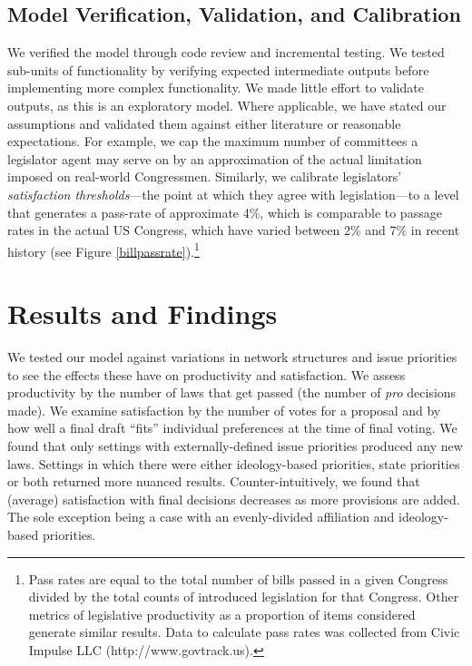 \documentclass[pdftex,12pt]{llncs}
\begin{document}
\subsection{Model Verification, Validation, and Calibration}
We verified the model through code review and incremental testing.
We tested sub-units of functionality by verifying expected intermediate outputs before implementing more complex functionality.
We made little effort to validate outputs, as this is an exploratory model.
Where applicable, we have stated our assumptions and validated them against either literature or reasonable expectations.
For example, we cap the maximum number of committees a legislator agent may serve on by an approximation of the actual limitation imposed on real-world Congressmen.
Similarly, we calibrate legislators' \textit{satisfaction thresholds}---the point at which they agree with legislation---to a level that generates a pass-rate of approximate 4\%, which is comparable to passage rates in the actual US Congress, which have varied between 2\% and 7\% in recent history (see Figure \ref{billpassrate}).\footnote{Pass rates are equal to the total number of bills passed in a given Congress divided by the total counts of introduced legislation for that Congress. Other metrics of legislative productivity as a proportion of items considered generate similar results. Data to calculate pass rates was collected from Civic Impulse LLC (http://www.govtrack.us).\label{passfn}}

\section{Results and Findings}
%
We tested our model against variations in network structures and issue priorities to see the effects these have on productivity and satisfaction. We assess productivity by the number of laws that get passed (the number of \textit{pro} decisions made). We examine satisfaction by the number of votes for a proposal and by how well a final draft ``fits'' individual preferences at the time of final voting. We found that only settings with externally-defined issue priorities produced any new laws. Settings in which there were either ideology-based priorities, state priorities or both returned more nuanced results. Counter-intuitively, we found that (average) satisfaction with final decisions decreases as more provisions are added. The sole exception being a case with an evenly-divided affiliation and ideology-based priorities.
\end{document}
